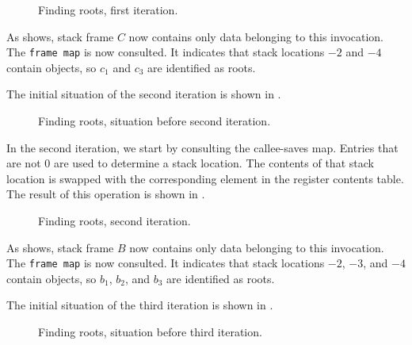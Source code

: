 \begin{figure}
\begin{center}
\end{center}
\caption{\label{fig-root-finding-example-1b}
Finding roots, first iteration.}
\end{figure}

As  shows, stack frame $C$ now
contains only data belonging to this invocation.  The \texttt{frame
  map} is now consulted.  It indicates that stack locations $-2$ and
$-4$ contain \commonlisp{} objects, so $c_1$ and $c_3$ are identified
as roots.

The initial situation of the second iteration is shown in
.

\begin{figure}
\begin{center}
\end{center}
\caption{\label{fig-root-finding-example-2}
Finding roots, situation before second iteration.}
\end{figure}

In the second iteration, we start by consulting the callee-saves map.
Entries that are not $0$ are used to determine a stack location.  The
contents of that stack location is swapped with the corresponding
element in the register contents table.  The result of this operation
is shown in .

\begin{figure}
\begin{center}
\end{center}
\caption{\label{fig-root-finding-example-2b}
Finding roots, second iteration.}
\end{figure}

As  shows, stack frame $B$ now
contains only data belonging to this invocation.  The \texttt{frame
  map} is now consulted.  It indicates that stack locations $-2$,
$-3$, and $-4$ contain \commonlisp{} objects, so $b_1$, $b_2$, and
$b_3$ are identified as roots.

The initial situation of the third iteration is shown in
.

\begin{figure}
\begin{center}
\end{center}
\caption{\label{fig-root-finding-example-3}
Finding roots, situation before third iteration.}
\end{figure}

